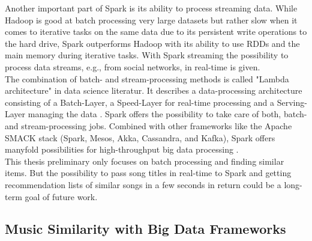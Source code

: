 \noindent Another important part of Spark is its ability to process streaming data. While Hadoop is good at batch processing very large datasets but rather slow when it comes to iterative tasks on the same data due to its persistent write operations to the hard drive, Spark outperforms Hadoop with its ability to use RDDs and the main memory during iterative tasks. 
With Spark streaming the possibility to process data streams, e.g., from social networks, in real-time is given.\\
The combination of batch- and stream-processing methods is called "Lambda architecture" in data science literatur. It describes a data-processing architecture consisting of a Batch-Layer, a Speed-Layer for real-time processing and a Serving-Layer managing the data \cite[pp. 8 f]{nextgenbig}. Spark offers the possibility to take care of both, batch- and stream-processing jobs. Combined with other frameworks like the Apache SMACK stack (Spark, Mesos, Akka, Cassandra, and Kafka), Spark offers manyfold possibilities for high-throughput big data processing \cite[p. 5]{smack}.\\
This thesis preliminary only focuses on batch processing and finding similar items. But the possibility to pass song titles in real-time to Spark and getting recommendation lists of similar songs in a few seconds in return could be a long-term goal of future work.\\

\subsection{Music Similarity with Big Data Frameworks}

